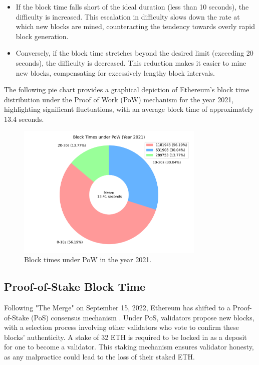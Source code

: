 \begin{itemize}
  \item If the block time falls short of the ideal duration (less
    than 10 seconds), the difficulty is increased. This escalation in
    difficulty slows down the rate at which new blocks are mined,
    counteracting the tendency towards overly rapid block generation.

  \item Conversely, if the block time stretches beyond the desired limit (exceeding
    20 seconds), the difficulty is decreased. This reduction makes it easier to
    mine new blocks, compensating for excessively lengthy block intervals.
\end{itemize}


The following pie chart provides a graphical depiction of Ethereum's block time
distribution under the Proof of Work (PoW) mechanism for the year 2021,
highlighting significant fluctuations, with an average block time of
approximately 13.4 seconds.


\begin{figure}[H]
  \centering
  \includegraphics[width=0.8\textwidth]{block_time_analysis/pow_block_time_pie_chart.png}
  \caption{Block times under PoW in the year 2021.}
  \label{fig:block_time_analysis_pow}
\end{figure}

\subsection{Proof-of-Stake Block Time}
Following "The Merge" on September 15, 2022, Ethereum has shifted to a
Proof-of-Stake (PoS) consensus mechanism \cite{eth_history}. Under PoS, validators propose new
blocks, with a selection process involving other validators who vote to confirm
these blocks' authenticity. A stake of 32 ETH is required to be locked in as a
deposit for one to become a validator. This staking mechanism ensures validator
honesty, as any malpractice could lead to the loss of their staked ETH.

